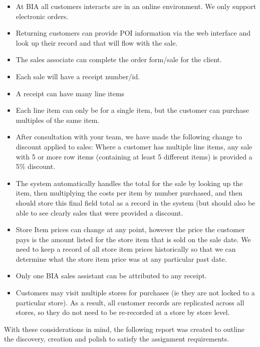 \documentclass{article}
\begin{document}
    \begin{itemize}
        \item At BIA all customers interacts are in an online environment. We only support electronic orders.
        \item Returning customers can provide POI information via the web interface and look up their record and that will flow with the sale.
        \item The sales associate can complete the order form/sale for the client.
        \item Each sale will have a receipt number/id.
        \item A receipt can have many line items 
        \item Each line item can only be for a single item, but the customer can purchase multiples of the same item.
        \item After consultation with your team, we have made the following change to discount applied to sales: 
        Where a customer has multiple line items, any sale with 5 or more row items (containing at least 5 different items) 
        is provided a 5\% discount.
        \item The system automatically handles the total for the sale by looking up the item, then multiplying the costs 
        per item by number purchased, and then should store this final field total as a record in the system (but should
        also be able to see clearly sales that were provided a discount. 
        \item Store Item prices can change at any point, however the price the customer pays is the amount listed for the
        store item that is sold on the sale date. We need to keep a record of all store item prices historically so that 
        we can determine what the store item price was at any particular past date.
        \item Only one BIA sales assistant can be attributed to any receipt.
        \item Customers may visit multiple stores for purchases (ie they are not locked to a particular store). As a 
        result, all customer records are replicated across all stores, so they do not need to be re-recorded at a 
        store by store level.
    \end{itemize}
   
    With these considerations in mind, the following report was created to outline
    the discovery, creation and polish to satisfy the assignment requirements.
\end{document}
